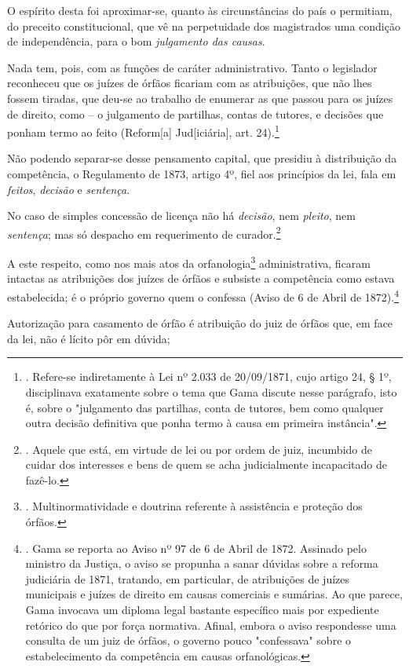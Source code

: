 O espírito desta foi aproximar-se, quanto às circunstâncias do país o
permitiam, do preceito constitucional, que vê na perpetuidade dos
magistrados uma condição de independência, para o bom \emph{julgamento
das causas}.

Nada tem, pois, com as funções de caráter administrativo. Tanto o
legislador reconheceu que os juízes de órfãos ficariam com as
atribuições, que não lhes fossem tiradas, que deu-se ao trabalho de
enumerar as que passou para os juízes de direito, como -- o julgamento
de partilhas, contas de tutores, e decisões que ponham termo ao feito
(Reform{[}a{]} Jud{[}iciária{]}, art. 24).\footnote{. Refere-se
  indiretamente à Lei nº 2.033 de 20/09/1871, cujo artigo 24, § 1º,
  disciplinava exatamente sobre o tema que Gama discute nesse parágrafo,
  isto é, sobre o "julgamento das partilhas, conta de tutores, bem como
  qualquer outra decisão definitiva que ponha termo à causa em primeira
  instância".}

Não podendo separar-se desse pensamento capital, que presidiu à
distribuição da competência, o Regulamento de 1873, artigo 4º, fiel aos
princípios da lei, fala em \emph{feitos}, \emph{decisão} e
\emph{sentença}.

No caso de simples concessão de licença não há \emph{decisão}, nem
\emph{pleito}, nem \emph{sentença}; mas só despacho em requerimento de
curador.\footnote{. Aquele que está, em virtude de lei ou por ordem de
  juiz, incumbido de cuidar dos interesses e bens de quem se acha
  judicialmente incapacitado de fazê-lo.}

A este respeito, como nos mais atos da orfanologia\footnote{.
  Multinormatividade e doutrina referente à assistência e proteção dos
  órfãos.} administrativa, ficaram intactas as atribuições dos juízes de
órfãos e subsiste a competência como estava estabelecida; é o próprio
governo quem o confessa (Aviso de 6 de Abril de 1872).\footnote{. Gama
  se reporta ao Aviso nº 97 de 6 de Abril de 1872. Assinado pelo
  ministro da Justiça, o aviso se propunha a sanar dúvidas sobre a
  reforma judiciária de 1871, tratando, em particular, de atribuições de
  juízes municipais e juízes de direito em causas comerciais e sumárias.
  Ao que parece, Gama invocava um diploma legal bastante específico mais
  por expediente retórico do que por força normativa. Afinal, embora o
  aviso respondesse uma consulta de um juiz de órfãos, o governo pouco
  "confessava" sobre o estabelecimento da competência em causas
  orfanológicas.}

Autorização para casamento de órfão é atribuição do juiz de órfãos que,
em face da lei, não é lícito pôr em dúvida;


